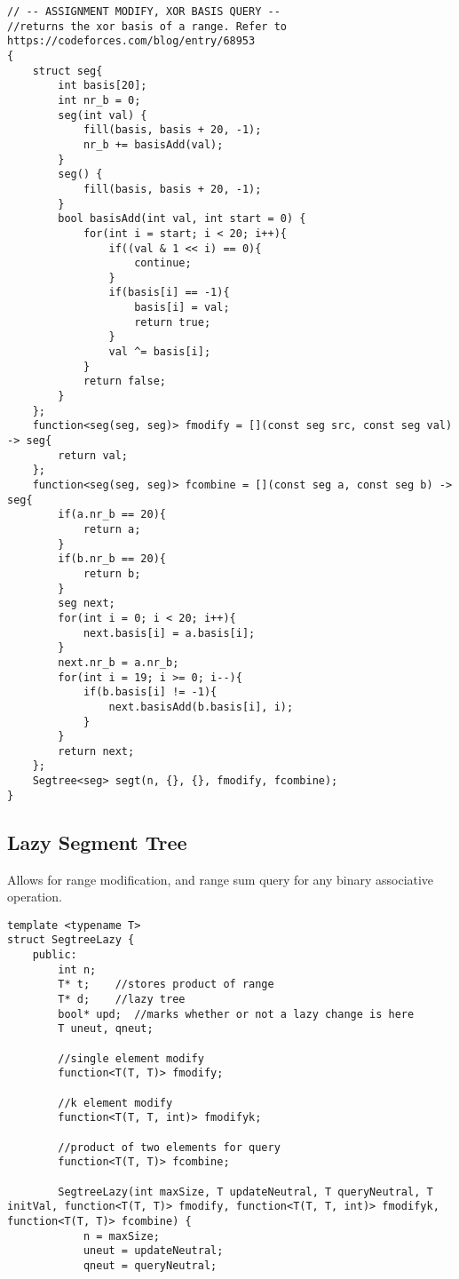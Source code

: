 \documentclass[8pt, headheight=10pt, a4paper]{article}
\begin{document}
\begin{multicols*}{3}
\begin{lstlisting}
// -- ASSIGNMENT MODIFY, XOR BASIS QUERY --
//returns the xor basis of a range. Refer to https://codeforces.com/blog/entry/68953
{   
    struct seg{
        int basis[20];
        int nr_b = 0;
        seg(int val) {
            fill(basis, basis + 20, -1);
            nr_b += basisAdd(val);
        }
        seg() {
            fill(basis, basis + 20, -1);
        }
        bool basisAdd(int val, int start = 0) {
            for(int i = start; i < 20; i++){
                if((val & 1 << i) == 0){
                    continue;
                }
                if(basis[i] == -1){
                    basis[i] = val;
                    return true;
                }
                val ^= basis[i];
            }
            return false;
        }
    };
    function<seg(seg, seg)> fmodify = [](const seg src, const seg val) -> seg{
        return val;
    };
    function<seg(seg, seg)> fcombine = [](const seg a, const seg b) -> seg{
        if(a.nr_b == 20){
            return a;
        }
        if(b.nr_b == 20){
            return b;
        }
        seg next;
        for(int i = 0; i < 20; i++){
            next.basis[i] = a.basis[i];
        }
        next.nr_b = a.nr_b;
        for(int i = 19; i >= 0; i--){
            if(b.basis[i] != -1){
                next.basisAdd(b.basis[i], i);
            }
        }
        return next;
    };
    Segtree<seg> segt(n, {}, {}, fmodify, fcombine);
}
\end{lstlisting}

\subsection{Lazy Segment Tree}
Allows for range modification, and range sum query for any binary associative operation. 
\begin{lstlisting}
template <typename T>
struct SegtreeLazy {
    public:
        int n;
        T* t;    //stores product of range
        T* d;    //lazy tree
        bool* upd;  //marks whether or not a lazy change is here
        T uneut, qneut;

        //single element modify
        function<T(T, T)> fmodify;

        //k element modify
        function<T(T, T, int)> fmodifyk;

        //product of two elements for query
        function<T(T, T)> fcombine;

        SegtreeLazy(int maxSize, T updateNeutral, T queryNeutral, T initVal, function<T(T, T)> fmodify, function<T(T, T, int)> fmodifyk, function<T(T, T)> fcombine) {
            n = maxSize;
            uneut = updateNeutral;
            qneut = queryNeutral;


\end{lstlisting}
\end{multicols*}
\end{document}
